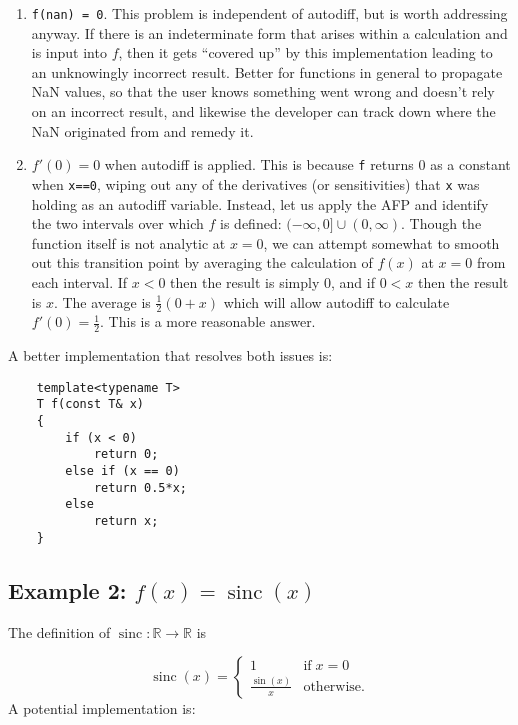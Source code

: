 \documentclass{article}
\DeclareMathOperator{\sinc}{sinc}
\begin{document}
\begin{enumerate}
\item {\tt f(nan) = 0}. This problem is independent of autodiff, but is worth addressing anyway. If there is
    an indeterminate form that arises within a calculation and is input into $f$, then it gets ``covered up'' by
    this implementation leading to an unknowingly incorrect result. Better for functions in general to propagate
    NaN values, so that the user knows something went wrong and doesn't rely on an incorrect result, and likewise
    the developer can track down where the NaN originated from and remedy it.
\item $f'(0) = 0$ when autodiff is applied. This is because {\tt f} returns 0 as a constant when {\tt x==0}, wiping
    out any of the derivatives (or sensitivities) that {\tt x} was holding as an autodiff variable. Instead, let us
    apply the AFP and identify the two intervals over which $f$ is defined: $(-\infty,0]\cup(0,\infty)$.
    Though the function itself is not analytic at $x=0$, we can attempt somewhat to smooth out this transition
    point by averaging the calculation of $f(x)$ at $x=0$ from each interval. If $x<0$ then the result is simply
    0, and if $0<x$ then the result is $x$. The average is $\frac{1}{2}(0 + x)$ which will allow autodiff to
    calculate $f'(0)=\frac{1}{2}$. This is a more reasonable answer.
\end{enumerate}
A better implementation that resolves both issues is:
\begin{verbatim}
    template<typename T>
    T f(const T& x)
    {
        if (x < 0)
            return 0;
        else if (x == 0)
            return 0.5*x;
        else
            return x;
    }
\end{verbatim}

\subsection{Example 2: $f(x)=\sinc(x)$}

The definition of $\sinc:\mathbb{R}\rightarrow\mathbb{R}$ is

\[
\sinc(x) = \begin{cases}
    1 &\text{if}\; x = 0 \\
    \frac{\sin(x)}{x} &\text{otherwise.}\end{cases}
\]
A potential implementation is:
\end{document}
